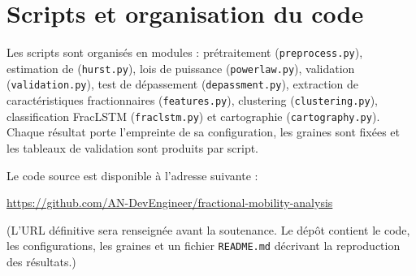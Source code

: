 \chapter{Scripts et organisation du code}
\label{ann:scripts}
Les scripts sont organisés en modules : prétraitement (\texttt{preprocess.py}), estimation de \Hurst{} (\texttt{hurst.py}), lois de puissance (\texttt{powerlaw.py}), validation (\texttt{validation.py}), test de dépassement (\texttt{depassment.py}), extraction de caractéristiques fractionnaires (\texttt{features.py}), clustering (\texttt{clustering.py}), classification FracLSTM (\texttt{fraclstm.py}) et cartographie (\texttt{cartography.py}). Chaque résultat porte l'empreinte de sa configuration, les graines sont fixées et les tableaux de validation sont produits par script.

\medskip
Le code source est disponible à l'adresse suivante :
\begin{center}
\url{https://github.com/AN-DevEngineer/fractional-mobility-analysis}
\end{center}
(L'URL définitive sera renseignée avant la soutenance. Le dépôt contient le code, les configurations, les graines et un fichier \texttt{README.md} décrivant la reproduction des résultats.)


